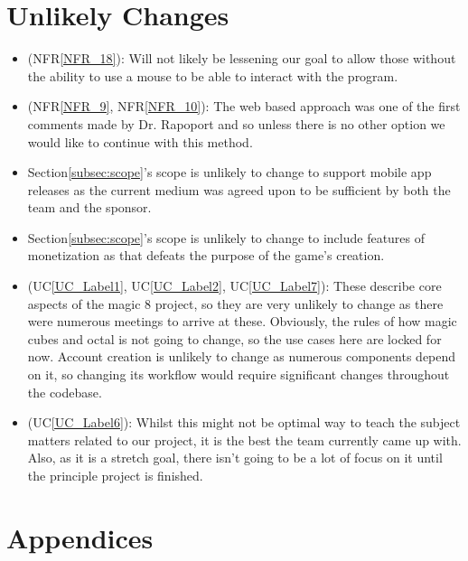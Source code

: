 \documentclass[12pt]{article}
\newcounter{lcnum} %
\newcounter{ulcnum} %
\begin{document}
\section{Unlikely Changes}    

\noindent \begin{itemize}
\item[ULC\refstepcounter{ulcnum}\theulcnum\label{ULC_meaningfulLabel}] (NFR\ref{NFR_18}): Will not likely be lessening our goal to allow those without the ability to use a mouse to be able to interact with the program.
\item[ULC\refstepcounter{ulcnum}\theulcnum\label{ULC_meaningfulLabel}] (NFR\ref{NFR_9}, NFR\ref{NFR_10}): The web based approach was one of the first comments made by Dr. Rapoport and so unless there is no other option we would like to continue with this method.
\item[ULC\refstepcounter{ulcnum}\theulcnum\label{ULC_meaningfulLabel}:] Section\ref{subsec:scope}'s scope is unlikely to change to support mobile app releases as the current medium was agreed upon to be sufficient by both the team and the sponsor.
\item[ULC\refstepcounter{ulcnum}\theulcnum\label{ULC_meaningfulLabel}:] Section\ref{subsec:scope}'s scope is unlikely to change to include features of monetization as that defeats the purpose of the game's creation.
\item[ULC\refstepcounter{ulcnum}\theulcnum\label{ULC_meaningfulLabel}] (UC\ref{UC_Label1}, UC\ref{UC_Label2}, UC\ref{UC_Label7}): These describe core aspects of the magic 8 project, so they are very unlikely to change as there were numerous meetings to arrive at these.
Obviously, the rules of how magic cubes and octal is not going to change, so the use cases here are locked for now. Account creation is unlikely to change as numerous components depend on it, so changing its workflow would require significant changes throughout the codebase.
\item[ULC\refstepcounter{ulcnum}\theulcnum\label{ULC_meaningfulLabel}] (UC\ref{UC_Label6}): Whilst this might not be optimal way to teach the subject matters related to our project, it is the best the team currently came up with. Also, as it is a stretch goal, there isn't going to be a lot of focus on it until the principle project is finished.
\end{itemize}

\newpage{}

\section{Appendices}
\end{document}
